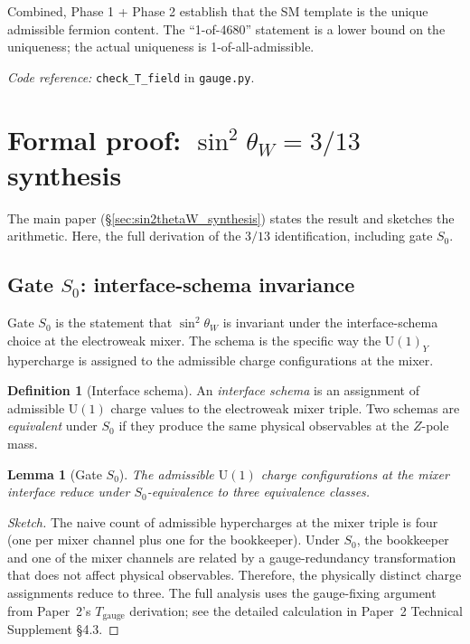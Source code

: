 \documentclass[11pt]{article}
\newcommand{\coderef}[2]{\smallskip\noindent\textit{Code reference:} \texttt{#1} in \texttt{#2}.}
\newcommand{\Un}{\mathrm{U}}
\newtheorem{lemma}[theorem]{Lemma}
\theoremstyle{definition}
\newtheorem{definition}[theorem]{Definition}
\begin{document}
Combined, Phase 1 + Phase 2 establish that the SM template is the unique admissible fermion content. The ``1-of-4680'' statement is a lower bound on the uniqueness; the actual uniqueness is 1-of-all-admissible.

\coderef{check\_T\_field}{gauge.py}

\clearpage

\section{Formal proof: \texorpdfstring{$\sin^2\theta_W = 3/13$}{sin2 thetaW = 3/13} synthesis}\label{sec:sin2thetaW_full}

The main paper (\S\ref{sec:sin2thetaW_synthesis}) states the result and sketches the arithmetic. Here, the full derivation of the $3/13$ identification, including gate $S_0$.

\subsection{Gate \texorpdfstring{$S_0$}{S0}: interface-schema invariance}\label{sec:S0}

Gate $S_0$ is the statement that $\sin^2\theta_W$ is invariant under the interface-schema choice at the electroweak mixer. The schema is the specific way the $\Un(1)_Y$ hypercharge is assigned to the admissible charge configurations at the mixer.

\begin{definition}[Interface schema]\label{def:interface_schema}
An \emph{interface schema} is an assignment of admissible $\Un(1)$ charge values to the electroweak mixer triple. Two schemas are \emph{equivalent} under $S_0$ if they produce the same physical observables at the $Z$-pole mass.
\end{definition}

\begin{lemma}[Gate $S_0$]\label{lem:S0}
The admissible $\Un(1)$ charge configurations at the mixer interface reduce under $S_0$-equivalence to three equivalence classes.
\end{lemma}

\begin{proof}[Sketch]
The naive count of admissible hypercharges at the mixer triple is four (one per mixer channel plus one for the bookkeeper). Under $S_0$, the bookkeeper and one of the mixer channels are related by a gauge-redundancy transformation that does not affect physical observables. Therefore, the physically distinct charge assignments reduce to three. The full analysis uses the gauge-fixing argument from Paper~2's $T_{\mathrm{gauge}}$ derivation; see the detailed calculation in Paper~2 Technical Supplement \S4.3.
\end{proof}
\end{document}
